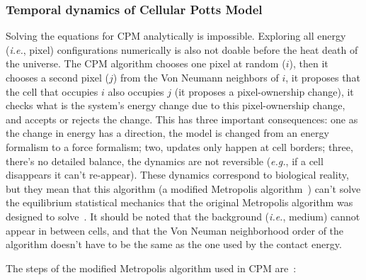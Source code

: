 
\subsubsection{Temporal dynamics of Cellular Potts Model}\label{sec:abm:apm-history:cpm-dyn}

Solving the equations for CPM analytically is impossible. Exploring all energy (\textit{i.e.}, pixel) configurations numerically is also not doable before the heat death of the universe. 
The CPM algorithm chooses one pixel at random ($i$), then it chooses a second pixel ($j$) from the Von Neumann neighbors of $i$,  it proposes that the cell that occupies $i$ also occupies $j$ (it proposes a pixel-ownership change), it checks what is the system's energy change due to this pixel-ownership change, and accepts or rejects the change.
This has three important consequences: one as the change in energy has a direction, the model is changed from an energy formalism to a force formalism; two, updates only happen at cell borders; three, there's no detailed balance, the dynamics are not reversible (\textit{e.g.}, if a cell disappears it can't re-appear). These dynamics correspond to biological reality, but they mean that this algorithm (a modified Metropolis algorithm~\cite{glazier2007magnetization, graner1992simulation}) can't solve the equilibrium statistical mechanics that the original Metropolis algorithm was designed to solve~\cite{metropolis1953equation, hastings1970monte}.
It should be noted that the background (\textit{i.e.}, medium) cannot appear in between cells, and that the Von Neuman neighborhood order of the algorithm doesn't have to be the same as the one used by the contact energy.

The steps of the modified Metropolis algorithm used in CPM are~\cite{swat_multi-scale_2012}:



